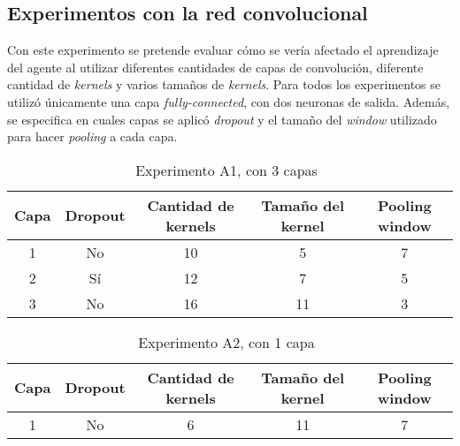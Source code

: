 \documentclass[journal]{IEEEtran}
\begin{document}
\subsection{Experimentos con la red convolucional}
    Con este experimento se pretende evaluar cómo se vería afectado el aprendizaje del agente al utilizar diferentes cantidades de capas de convolución, diferente cantidad de \textit{kernels} y varios tamaños de \textit{kernels}. Para todos los experimentos se utilizó únicamente una capa \textit{fully-connected}, con dos neuronas de salida. Además, se especifica en cuales capas se aplicó \textit{dropout} y el tamaño del \textit{window} utilizado para hacer \textit{pooling} a cada capa.
    
    \begin{table}[h!]
    \centering
    \begin{tabular}{@{}ccccc@{}}
    \toprule
    Capa & Dropout & Cantidad de kernels & Tamaño del kernel & Pooling window\\ \midrule
    1     & No      & 10                  & 5                 & 7 \\
    2     & Sí      & 12                  & 7                 & 5 \\
    3     & No      & 16                  & 11                & 3 \\ \bottomrule
    
    \end{tabular}
    \caption{Experimento A1, con 3 capas~\label{expA1}}
    \end{table}
    
    
    \begin{table}[h!]
    \centering
    
    \begin{tabular}{@{}ccccc@{}}
    \toprule
    Capa & Dropout & Cantidad de kernels & Tamaño del kernel & Pooling window\\ \midrule
    1     & No      & 6                   & 11                & 7 \\ \bottomrule
    \end{tabular}
    \caption{Experimento A2, con 1 capa~\label{expA2}}
    \end{table}
    
\end{document}
